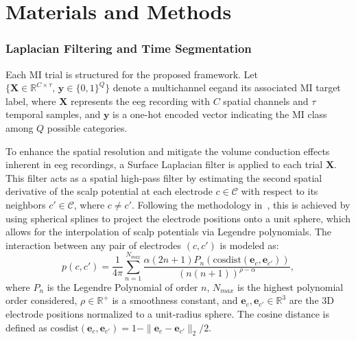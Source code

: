 \section{Materials and Methods}

\subsubsection{Laplacian Filtering and Time Segmentation}\label{sec:laplacian}
Each MI trial is structured for the proposed framework. Let $\{\mathbf{X} \in \mathbb{R}^{C \times \tau},\, \mathbf{y} \in \{0,1\}^Q\}$ denote a multichannel \gls{eeg}and its associated MI target label, where $\mathbf{X}$ represents the \gls{eeg} recording with $C$ spatial channels and $\tau$ temporal samples, and $\mathbf{y}$ is a one-hot encoded vector indicating the MI class among $Q$ possible categories.

To enhance the spatial resolution and mitigate the volume conduction effects inherent in \gls{eeg} recordings, a Surface Laplacian filter is applied to each trial $\mathbf{X} $. This filter acts as a spatial high-pass filter by estimating the second spatial derivative of the scalp potential at each electrode $c \in \mathcal{C}$ with respect to its neighbors $c' \in \mathcal{C}$, where $c \neq c'$. Following the methodology in~\cite{cohen2014analyzing}, this is achieved by using spherical splines to project the electrode positions onto a unit sphere, which allows for the interpolation of scalp potentials via Legendre polynomials. The interaction between any pair of electrodes $(c, c')$ is modeled as:
\begin{equation}
    p(c,c') = \frac{1}{4\pi} \sum_{n=1}^{N_{max}} \frac{\alpha (2n+1)P_n\left(\text{cosdist}(\mathbf{e}_c, \mathbf{e}_{c'})\right)}{(n(n+1))^{\rho - \alpha}},
    \label{eq:spline_interpolation}
\end{equation}
%
where $P_n$ is the Legendre Polynomial of order $n$, $N_{max}$ is the highest polynomial order considered, $\rho \in \mathbb{R}^{+}$ is a smoothness constant, and $\mathbf{e}_c, \mathbf{e}_{c'} \in \mathbb{R}^3$ are the 3D electrode positions normalized to a unit-radius sphere. The cosine distance is defined as $\text{cosdist}(\mathbf{e}_c, \mathbf{e}_{c'}) = 1 - \|\mathbf{e}_c - \mathbf{e}_{c'}\|_2 / 2$.


